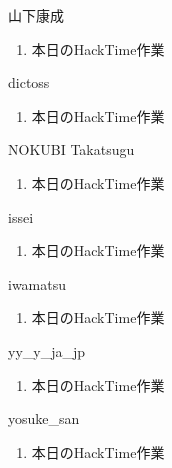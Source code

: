 \begin{prework}{ 山下康成 }
  \begin{enumerate}
  \item 本日のHackTime作業
  \end{enumerate}
\end{prework}

\begin{prework}{ dictoss }
  \begin{enumerate}
  \item 本日のHackTime作業
  \end{enumerate}
\end{prework}

\begin{prework}{ NOKUBI Takatsugu }
  \begin{enumerate}
  \item 本日のHackTime作業
  \end{enumerate}
\end{prework}

\begin{prework}{ issei }
  \begin{enumerate}
  \item 本日のHackTime作業
  \end{enumerate}
\end{prework}

\begin{prework}{ iwamatsu }
  \begin{enumerate}
  \item 本日のHackTime作業
  \end{enumerate}
\end{prework}

\begin{prework}{ yy\_y\_ja\_jp }
  \begin{enumerate}
  \item 本日のHackTime作業
  \end{enumerate}
\end{prework}

\begin{prework}{ yosuke\_san }
  \begin{enumerate}
  \item 本日のHackTime作業
  \end{enumerate}
\end{prework}

